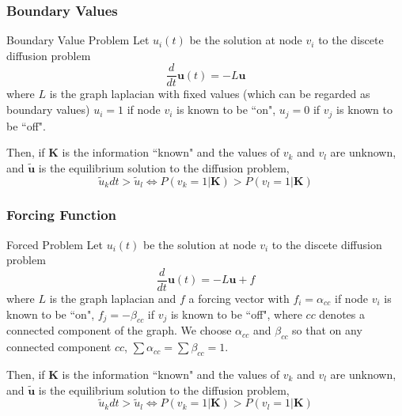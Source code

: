 \documentclass{beamer}
\renewcommand{\b}{\bm}
\begin{document}
\begin{frame}
\frametitle{Boundary Values}
	\begin{block}{Boundary Value Problem}
	Let $u_i(t)$ be the solution at node $v_i$ to the discete diffusion problem
	\[
	\frac{d}{dt}\b{u}(t)  = - L\b{u}
	\]
	where $L$ is the  graph laplacian with fixed values (which can be regarded as boundary values) $u_i = 1$ if node $v_i$ is known to be ``on", $u_j = 0$ if $v_j$ is known to be ``off". 
	
	Then, if $\b{K}$ is the information ``known" and the values of $v_{k}$ and $v_{l}$ are unknown, and $\b{\tilde{u}}$ is the equilibrium solution to the diffusion problem,
	\[
	\tilde{u}_k dt >  \tilde{u}_l \Leftrightarrow  P(v_k=  1|\b{K}) > P(v_l = 1|\b{K})
	\]
\end{block}
\end{frame}
\begin{frame}
\frametitle{Forcing Function}
\begin{block}{Forced Problem}
	Let $u_i(t)$ be the solution at node $v_i$ to the discete diffusion problem
	\[
	\frac{d}{dt}\b{u}(t)  = - L\b{u} + f
	\]
	where $L$ is the  graph laplacian and $f$ a forcing vector with $f_i = \alpha_{cc}$ if node $v_i$ is known to be ``on", $f_j = -\beta_{cc}$ if $v_j$ is known to be ``off", where $cc$ denotes a connected component of the graph. We choose $\alpha_{cc}$ and $\beta_{cc}$ so that on any connected component $cc$, $\sum \alpha_{cc}= \sum \beta_{cc}= 1$. 
	
	Then, if $\b{K}$ is the information ``known" and the values of $v_{k}$ and $v_{l}$ are unknown, and $\b{\tilde{u}}$ is the equilibrium solution to the diffusion problem,
	\[
	\tilde{u}_k dt >  \tilde{u}_l \Leftrightarrow  P(v_k=  1|\b{K}) > P(v_l = 1|\b{K})
	\]
\end{block}
\end{frame}
\end{document}

